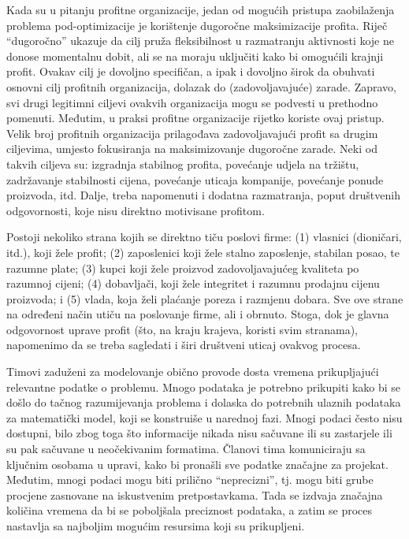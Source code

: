 \documentclass[a4paper, utf8, 11pt, colorlinks]{book}
\theoremstyle{definition}
\begin{document}
Kada su u pitanju profitne organizacije, jedan od mogućih pristupa zaobilaženja problema pod-optimizacije je korištenje dugoročne maksimizacije profita. Riječ ``dugoročno'' ukazuje da cilj pruža fleksibilnost u razmatranju aktivnosti koje ne donose momentalnu dobit, ali se na moraju uključiti kako bi omogućili krajnji profit. Ovakav cilj je dovoljno specifičan, a ipak i dovoljno širok da obuhvati osnovni cilj profitnih organizacija, dolazak do (zadovoljavajuće) zarade. Zapravo, svi drugi legitimni ciljevi ovakvih organizacija mogu se podvesti u prethodno pomenuti. Međutim, u praksi profitne organizacije rijetko koriste ovaj pristup. Velik broj profitnih organizacija prilagođava zadovoljavajući profit sa drugim ciljevima, umjesto fokusiranja na maksimizovanje dugoročne zarade. Neki od takvih ciljeva su: izgradnja stabilnog profita, povećanje udjela na tržištu, zadržavanje stabilnosti cijena, povećanje uticaja kompanije, povećanje ponude proizvoda, itd. 
Dalje, treba napomenuti i dodatna razmatranja, poput društvenih odgovornosti, koje nisu direktno motivisane profitom.  

Postoji nekoliko strana kojih se direktno tiču poslovi firme: (1) vlasnici (dioničari, itd.), koji žele profit;   (2) zaposlenici koji žele stalno zaposlenje, stabilan posao, te razumne plate; (3) kupci koji žele proizvod zadovoljavajućeg kvaliteta po razumnoj cijeni;
(4) dobavljači, koji žele integritet i razumnu prodajnu cijenu proizvoda; i
(5) vlada, koja želi plaćanje poreza i razmjenu dobara. Sve ove strane na određeni način utiču na poslovanje firme, ali i obrnuto.  Stoga, dok je glavna odgovornost uprave profit (što, na kraju krajeva, koristi svim stranama), napomenimo da se treba sagledati i širi društveni uticaj ovakvog procesa. 
 
 Timovi zaduženi za modelovanje obično provode dosta vremena prikupljajući relevantne podatke o problemu. Mnogo podataka je potrebno prikupiti kako bi se došlo do tačnog razumijevanja problema i dolaska do potrebnih ulaznih podataka za matematički model, koji se konstruiše u narednoj fazi.  Mnogi  podaci često nisu dostupni, bilo zbog toga što informacije nikada nisu sačuvane ili su zastarjele ili su pak sačuvane u neočekivanim formatima.   Članovi tima komuniciraju sa ključnim osobama u upravi, kako bi pronašli sve podatke značajne za projekat. Međutim, mnogi podaci mogu biti prilično ``neprecizni'', tj. mogu biti grube procjene zasnovane na iskustvenim pretpostavkama. Tada se izdvaja značajna količina vremena da bi se poboljšala  
preciznost podataka, a zatim se proces nastavlja sa najboljim mogućim resursima koji su prikupljeni. 
\end{document}
